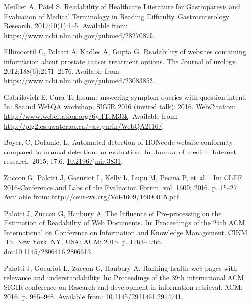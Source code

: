 \documentclass[10pt,a4paper]{article}
\begin{document}
\begin{thebibliography}{10}
	Meillier A, Patel S.
	\newblock Readability of Healthcare Literature for Gastroparesis and Evaluation
	of Medical Terminology in Reading Difficulty.
	\newblock Gastroenterology Research. 2017;10(1):1--5.
	\newblock Available from: \url{https://www.ncbi.nlm.nih.gov/pubmed/28270870}.
	
	Ellimoottil C, Polcari A, Kadlec A, Gupta G.
	\newblock Readability of websites containing information about prostate cancer
	treatment options.
	\newblock The Journal of urology. 2012;188(6):2171--2176.
	\newblock Available from: \url{https://www.ncbi.nlm.nih.gov/pubmed/23083852}.
	
	Gabrilovich E.
	\newblock Cura Te Ipsum: answering symptom queries with question intent.
	\newblock In: Second WebQA workshop, SIGIR 2016 (invited talk); 2016.
	WebCitation: \url{http://www.webcitation.org/6yHTeM33k}.
	\newblock Available from:
	\url{http://plg2.cs.uwaterloo.ca/~avtyurin/WebQA2016/}.
	
    Boyer, C, Dolamic, L.
    \newblock Automated detection of HONcode website conformity compared to manual 
    detection: an evaluation.
    \newblock In: Journal of medical Internet research. 2015; 17:6.
    \newblock \href {http://doi.org/10.2196/jmir.3831}
    {10.2196/jmir.3831}.

	Zuccon G, Palotti J, Goeuriot L, Kelly L, Lupu M, Pecina P, et~al.
	.
	\newblock In: {CLEF 2016-Conference and Labs of the Evaluation Forum}. vol.
	1609; 2016. p. 15--27.
	\newblock Available from: \url{http://ceur-ws.org/Vol-1609/16090015.pdf}.

	Palotti J, Zuccon G, Hanbury A.
	\newblock The Influence of Pre-processing on the Estimation of Readability of
	Web Documents.
	\newblock In: Proceedings of the 24th ACM International on Conference on
	Information and Knowledge Management. CIKM '15. New York, NY, USA: ACM; 2015.
	p. 1763--1766.
	\newblock \href {http://dx.doi.org/10.1145/2806416.2806613}
	{doi:10.1145/2806416.2806613}.
	
	Palotti J, Goeuriot L, Zuccon G, Hanbury A.
	\newblock Ranking health web pages with relevance and understandability.
	\newblock In: Proceedings of the 39th international ACM SIGIR conference on
	Research and development in information retrieval. ACM; 2016. p. 965--968.
	\newblock Available from: \url{10.1145/2911451.2914741}.
	

\end{thebibliography}
\end{document}
